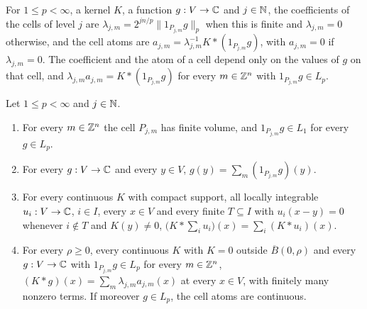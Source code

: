 \begin{definition}
\label{def:cell-atoms}
\leanok
{}
For $1 \leq p < \infty$, a kernel $K$, a function $g : V \to \mathbb{C}$ and $j \in \mathbb{N}$, the
coefficients of the cells of level $j$ are $\lambda_{j,m} = 2^{jn/p} \|1_{P_{j,m}} g\|_p$ when this
is finite and $\lambda_{j,m} = 0$ otherwise, and the cell atoms are
$a_{j,m} = \lambda_{j,m}^{-1} K * (1_{P_{j,m}} g)$, with $a_{j,m} = 0$ if $\lambda_{j,m} = 0$.
The coefficient and the atom of a cell depend only on the values of $g$ on that cell, and
$\lambda_{j,m} a_{j,m} = K * (1_{P_{j,m}} g)$ for every $m \in \mathbb{Z}^n$ with
$1_{P_{j,m}} g \in L_p$.
\end{definition}

\begin{lemma}
\label{lem:cell-decomposition}
\leanok
{}
Let $1 \leq p < \infty$ and $j \in \mathbb{N}$.
\begin{enumerate}
  \item For every $m \in \mathbb{Z}^n$ the cell $P_{j,m}$ has finite volume, and
    $1_{P_{j,m}} g \in L_1$ for every $g \in L_p$.
  \item For every $g : V \to \mathbb{C}$ and every $y \in V$, $g(y) = \sum_m (1_{P_{j,m}} g)(y)$.
  \item For every continuous $K$ with compact support, all locally integrable
    $u_i : V \to \mathbb{C}$, $i \in I$, every $x \in V$ and every finite $T \subseteq I$ with
    $u_i(x - y) = 0$ whenever $i \notin T$ and $K(y) \neq 0$,
    $\bigl(K * \sum_i u_i\bigr)(x) = \sum_i (K * u_i)(x)$.
  \item For every $\rho \geq 0$, every continuous $K$ with $K = 0$ outside
    $\overline{B}(0, \rho)$ and every $g : V \to \mathbb{C}$ with $1_{P_{j,m}} g \in L_p$ for every
    $m \in \mathbb{Z}^n$, $(K * g)(x) = \sum_m \lambda_{j,m} a_{j,m}(x)$ at every $x \in V$, with finitely
    many nonzero terms. If moreover $g \in L_p$, the cell atoms are continuous.
\end{enumerate}
\end{lemma}

